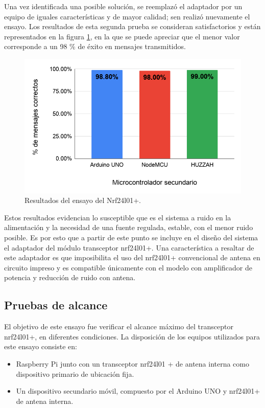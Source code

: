 Una vez identificada una posible solución, se reemplazó el adaptador por un equipo de iguales características y de mayor calidad; sen realizó nuevamente el ensayo. Los resultados de esta segunda prueba se consideran satisfactorios y están representados en la figura \ref{fig:figura_b}, en la que se puede apreciar que el menor valor corresponde a un 98 \% de éxito en mensajes transmitidos.


\begin{figure}[ht]
	\centering
	\includegraphics[scale=.45]{./Figures/Capitulo4/Figura_B.png}
	\caption{Resultados del ensayo del Nrf24l01+.}
	\label{fig:figura_b}
\end{figure}

Estos resultados evidencian lo susceptible que es el sistema a ruido en la alimentación y la necesidad de una fuente regulada, estable, con el menor ruido posible. Es por esto que a partir de este punto se incluye en el diseño del sistema el adaptador del módulo transceptor nrf24l01+. Una característica a resaltar de este adaptador es que imposibilita el uso del nrf24l01+ convencional de antena en circuito impreso y es compatible únicamente con el modelo con amplificador de potencia y reducción de ruido con antena.


\subsection{Pruebas de alcance}
 

El objetivo de este ensayo fue verificar el alcance máximo del transceptor nrf24l01+, en diferentes condiciones. La disposición de los equipos utilizados para este ensayo consiste en:

\begin{itemize}
\item Raspberry Pi junto con un transceptor nrf24l01 + de antena interna como dispositivo primario de ubicación fija.
\item Un dispositivo secundario móvil, compuesto por el Arduino UNO y nrf24l01+ de antena interna.
\end{itemize}

